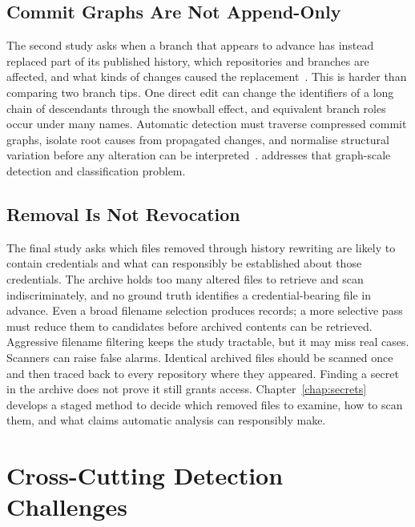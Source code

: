 \subsection{Commit Graphs Are Not Append-Only}
\label{subsec:intro-rq-histories}

The second study asks when a branch that appears to advance has instead replaced part of its published history, which repositories and branches are affected, and what kinds of changes caused the replacement~\cite{DBLP:conf/kbse/RapaportPTZ25}.
This is harder than comparing two branch tips.
One direct edit can change the identifiers of a long chain of descendants through the snowball effect, and equivalent branch roles occur under many names.
Automatic detection must traverse compressed commit graphs, isolate root causes from propagated changes, and normalise structural variation before any alteration can be interpreted~\cite{torresarias2016gitmetadata}.
 addresses that graph-scale detection and classification problem.

\subsection{Removal Is Not Revocation}
\label{subsec:intro-rq-secrets}

The final study asks which files removed through history rewriting are likely to contain credentials and what can responsibly be established about those credentials.
The archive holds too many altered files to retrieve and scan indiscriminately, and no ground truth identifies a credential-bearing file in advance.
Even a broad filename selection produces \SecretFirstExtractionShort records; a more selective pass must reduce them to \SecretSecondExtractionShort candidates before archived contents can be retrieved.
Aggressive filename filtering keeps the study tractable, but it may miss real cases.
Scanners can raise false alarms.
Identical archived files should be scanned once and then traced back to every repository where they appeared.
Finding a secret in the archive does not prove it still grants access.
Chapter~\ref{chap:secrets} develops a staged method to decide which removed files to examine, how to scan them, and what claims automatic analysis can responsibly make.

\section{Cross-Cutting Detection Challenges}
\label{sec:intro-contributions}

